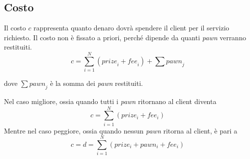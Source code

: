 \subsection{Costo}
Il costo $ c $ rappresenta quanto denaro dovrà spendere il client per il servizio
richiesto. Il costo non è fissato a priori,
perché dipende da quanti \textit{pawn} verranno
restituiti.
$$ c = \sum_{i=1}^{N} (\textit{prize}_i + \textit{fee}_i) + \sum \textit{pawn}_j $$
\begin{center}
	dove $ \sum \textit{pawn}_j $ è la somma dei \textit{pawn} restituiti.
\end{center}

Nel caso migliore, ossia quando tutti i \textit{pawn} ritornano al client diventa
$$ c = \sum_{i=1}^{N} (prize_i + fee_i) $$
Mentre nel caso peggiore, ossia quando nessun \textit{pawn}
ritorna al client, è pari a
$$ c = d = \sum_{i=1}^{N} (prize_i + pawn_i + fee_i) $$
